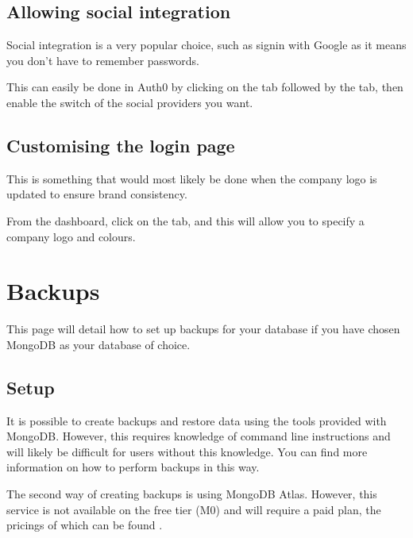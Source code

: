 \documentclass[letterpaper,10pt,english]{sphinxmanual}
\let\oldsubsection\subsection
\renewcommand{\subsection}{\needspace{6\baselineskip}\oldsubsection}
\begin{document}
\subsection{Allowing social integration}
\label{\detokenize{docs/Expansion/auth-expansion:allowing-social-integration}}
Social integration is a very popular choice, such as signin with Google
as it means you don’t have to remember passwords.

This can easily be done in Auth0 by clicking on the  tab
followed by the  tab, then enable the switch of the social
providers you want.


\subsection{Customising the login page}
\label{\detokenize{docs/Expansion/auth-expansion:customising-the-login-page}}
This is something that would most likely be done when the company logo
is updated to ensure brand consistency.

From the dashboard, click on the  tab, and this will
allow you to specify a company logo and colours.


\section{Backups}
\label{\detokenize{docs/Expansion/backups:backups}}\label{\detokenize{docs/Expansion/backups::doc}}
This page will detail how to set up backups for your database if you
have chosen MongoDB as your database of choice.


\subsection{Setup}
\label{\detokenize{docs/Expansion/backups:setup}}
It is possible to create backups and restore data using the tools
provided with MongoDB. However, this requires knowledge of command line
instructions and will likely be difficult for users without this
knowledge. You can find more information
on how to perform backups in this way.

The second way of creating backups is using MongoDB Atlas. However, this
service is not available on the free tier (M0) and will require a paid
plan, the pricings of which can be found
.
\end{document}
